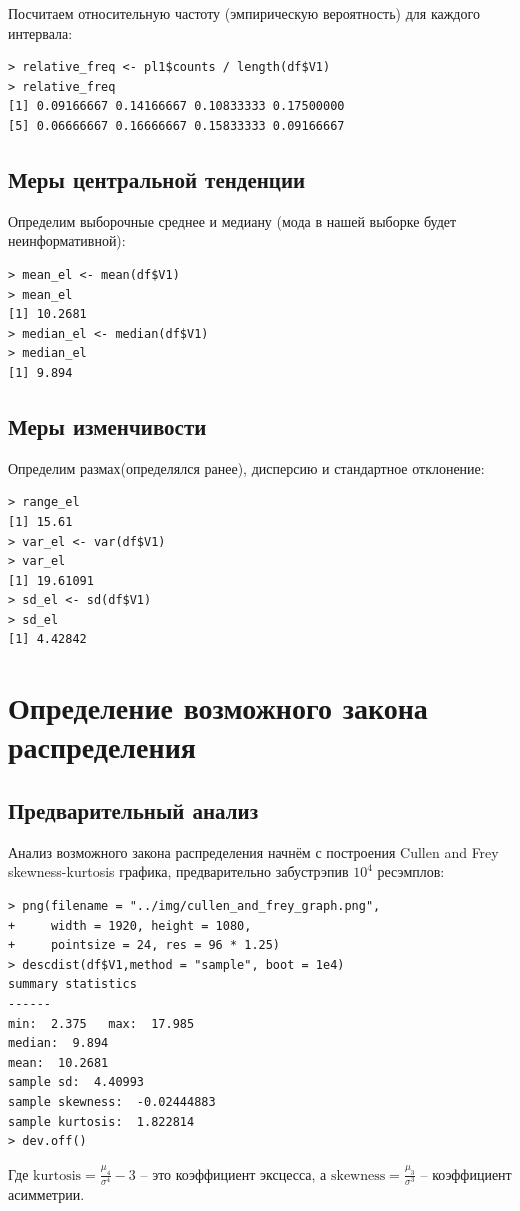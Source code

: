\documentclass[14pt,a4paper]{scrartcl}
\begin{document}
Посчитаем относительную частоту (эмпирическую вероятность) для каждого интервала:
\begin{lstlisting}
> relative_freq <- pl1$counts / length(df$V1)
> relative_freq
[1] 0.09166667 0.14166667 0.10833333 0.17500000
[5] 0.06666667 0.16666667 0.15833333 0.09166667
\end{lstlisting}

\subsection{Меры центральной тенденции}
Определим выборочные среднее и медиану (мода в нашей выборке будет неинформативной):
\begin{lstlisting}
> mean_el <- mean(df$V1)
> mean_el
[1] 10.2681
> median_el <- median(df$V1)
> median_el
[1] 9.894
\end{lstlisting}

\subsection{Меры изменчивости}
Определим размах(определялся ранее), дисперсию и стандартное отклонение:
\begin{lstlisting}
> range_el
[1] 15.61
> var_el <- var(df$V1)
> var_el
[1] 19.61091
> sd_el <- sd(df$V1)
> sd_el
[1] 4.42842
\end{lstlisting}


\section{Определение возможного закона распределения}
\subsection{Предварительный анализ}
Анализ возможного закона распределения начнём с построения Cullen and Frey skewness-kurtosis графика, предварительно забустрэпив $10^4$ ресэмплов:
\begin{lstlisting}
> png(filename = "../img/cullen_and_frey_graph.png", 
+     width = 1920, height = 1080,
+     pointsize = 24, res = 96 * 1.25)
> descdist(df$V1,method = "sample", boot = 1e4)
summary statistics
------
min:  2.375   max:  17.985 
median:  9.894 
mean:  10.2681 
sample sd:  4.40993 
sample skewness:  -0.02444883 
sample kurtosis:  1.822814 
> dev.off() 
\end{lstlisting}

Где $\text{kurtosis} = \frac{\mu_4}{\sigma^4} - 3$ -- это коэффициент эксцесса, а $\text{skewness} = \frac{\mu_3}{\sigma^3} $ -- коэффициент асимметрии.
\end{document}
